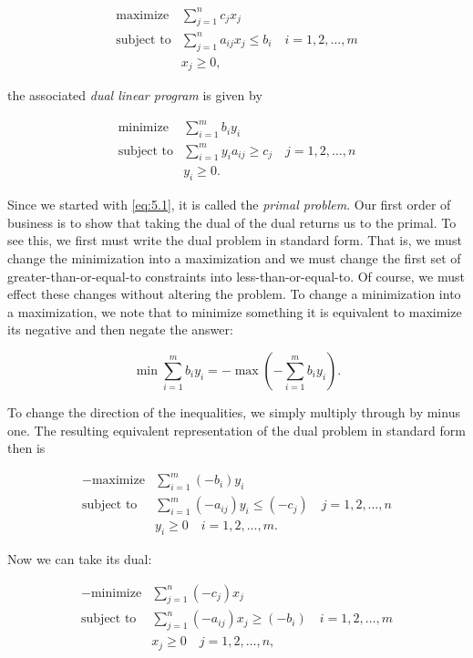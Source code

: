 \documentclass{article}
\begin{document}
\begin{equation}\label{eq:5.1}
\begin{array}{ll}
\text{maximize} & \sum_{j=1}^{n}c_{j}x_{j} \\
\text{subject to} & \sum_{j=1}^{n}a_{ij}x_{j} \leq b_{i} \quad i=1,2,\ldots,m \\
& x_{j} \geq 0,
\end{array}
\end{equation}

the associated \emph{dual linear program} is given by

\[
\begin{array}{ll}
\text{minimize} & \sum_{i=1}^{m}b_{i}y_{i} \\
\text{subject to} & \sum_{i=1}^{m}y_{i}a_{ij} \geq c_{j} \quad j=1,2,\ldots,n \\
& y_{i} \geq 0.
\end{array}
\]

Since we started with \eqref{eq:5.1}, it is called the \emph{primal problem}. Our first order of business is to show that taking the dual of the dual returns us to the primal. To see this, we first must write the dual problem in standard form. That is, we must change the minimization into a maximization and we must change the first set of greater-than-or-equal-to constraints into less-than-or-equal-to. Of course, we must effect these changes without altering the problem. To change a minimization into a maximization, we note that to minimize something it is equivalent to maximize its negative and then negate the answer:

\[
\min \sum_{i=1}^{m}b_{i}y_{i} = -\max \left(-\sum_{i=1}^{m}b_{i}y_{i}\right).
\]

To change the direction of the inequalities, we simply multiply through by minus one. The resulting equivalent representation of the dual problem in standard form then is

\[
\begin{array}{ll}
-\text{maximize} & \sum_{i=1}^{m}(-b_{i})y_{i} \\
\text{subject to} & \sum_{i=1}^{m}(-a_{ij})y_{i} \leq (-c_{j}) \quad j=1,2,\ldots,n \\
& y_{i} \geq 0 \quad i=1,2,\ldots,m.
\end{array}
\]

Now we can take its dual:

\[
\begin{array}{ll}
-\text{minimize} & \sum_{j=1}^{n}(-c_{j})x_{j} \\
\text{subject to} & \sum_{j=1}^{n}(-a_{ij})x_{j} \geq (-b_{i}) \quad i=1,2,\ldots,m \\
& x_{j} \geq 0 \quad j=1,2,\ldots,n,
\end{array}
\]
\end{document}
